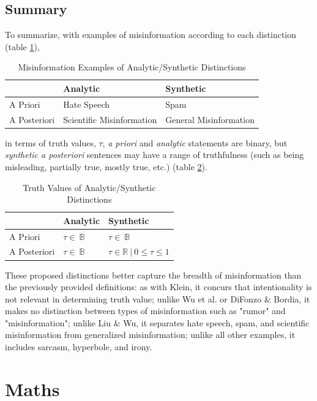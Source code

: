 \documentclass[12pt]{article}
\begin{document}
\subsection{Summary}
\label{truthvalueappendixsummary}
To summarize, with examples of misinformation according to each distinction (table \ref{tab:misinformationexamples}),
\begin{table}[htbp]
    \centering
    \begin{tabular}{ |p{3cm}|p{5cm}|p{5cm}|}
    \hline
    & Analytic & Synthetic\\
    \hline
    A Priori & Hate Speech & Spam\\
    \hline
    A Posteriori &  Scientific Misinformation  & General Misinformation\\
    \hline
    \end{tabular}
    \caption{Misinformation Examples of Analytic/Synthetic Distinctions}
    \label{tab:misinformationexamples}
\end{table}
in terms of truth values, $\tau$, \textit{a priori} and \textit{analytic} statements are binary, but \textit{synthetic a posteriori} sentences may have a range of truthfulness (such as being misleading, partially true, mostly true, etc.) (table \ref{tab:truthvalues}).

\begin{table}[h!]
\centering
\begin{tabular}{ |p{3cm}|p{5cm}|p{5cm}|}
 \hline
  & Analytic & Synthetic\\
 \hline
 A Priori & $\tau \in\ \mathbb{B}$ & $\tau \in\ \mathbb{B}$\\
 \hline
 A Posteriori &  $\tau \in\ \mathbb{B}$  & $\tau \in \mathbb{R} \ | \ 0 \leq \tau \leq 1$ \\
 \hline
\end{tabular}
\caption{Truth Values of Analytic/Synthetic Distinctions}
\label{tab:truthvalues}
\end{table}

These proposed distinctions better capture the breadth of misinformation than the previously provided definitions: as with Klein, it concurs that intentionality is not relevant in determining truth value; unlike Wu et al. or DiFonzo \& Bordia, it makes no distinction between types of misinformation such as "rumor" and "misinformation"; unlike Liu \& Wu, it separates hate speech, spam, and scientific misinformation from generalized misinformation; unlike all other examples, it includes sarcasm, hyperbole, and irony. 



\section{Maths}
\newpage



\end{document}
